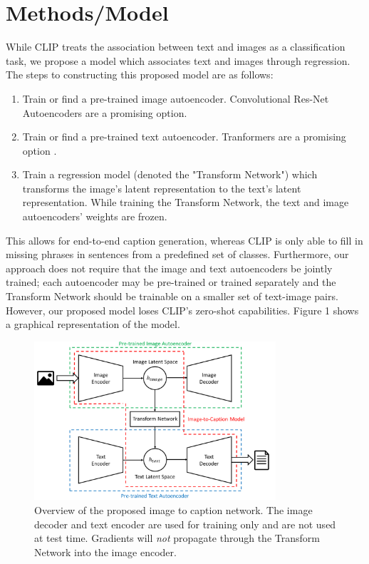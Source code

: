 \documentclass{article}
\begin{document}
\section{Methods/Model}
While CLIP treats the association between text and images as a classification task, we propose a model which associates text and images through regression. The steps to constructing this proposed model are as follows:
\begin{enumerate}
    \item Train or find a pre-trained image autoencoder. Convolutional Res-Net Autoencoders are a promising option.
    \item Train or find a pre-trained text autoencoder. Tranformers are a promising option \cite{9373350}.
    \item Train a regression model (denoted the "Transform Network") which transforms the image's latent representation to the text's latent representation. While training the Transform Network, the text and image autoencoders' weights are frozen.
\end{enumerate}
 This allows for end-to-end caption generation, whereas CLIP is only able to fill in missing phrases in sentences from a predefined set of classes. Furthermore, our approach does not require that the image and text autoencoders be jointly trained; each autoencoder may be pre-trained or trained separately and the Transform Network should be trainable on a smaller set of text-image pairs. However, our proposed model loses CLIP's zero-shot capabilities. Figure 1 shows a graphical representation of the model.
\begin{figure}[H]
    \centering
    \includegraphics[width=0.8\textwidth,keepaspectratio]{Network Overview.png}
    \caption{Overview of the proposed image to caption network. The image decoder and text encoder are used for training only and are not used at test time. Gradients will \textit{not} propagate through the Transform Network into the image encoder.}
\end{figure}
\end{document}
